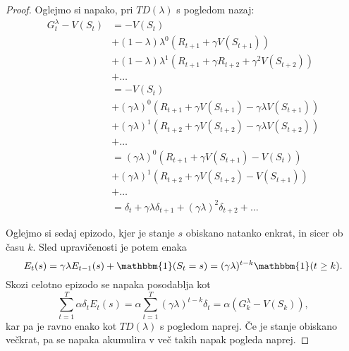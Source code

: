 \documentclass[12pt,a4paper]{amsart}
\theoremstyle{definition} %
\theoremstyle{plain} %
\begin{document}
\begin{proof} 
    Oglejmo si napako, pri $TD(\lambda)$ s pogledom nazaj:
    \begin{align*}
    G_t^\lambda - V(S_t) &= - V(S_t) \\
                         &+ (1 - \lambda) \lambda^0 (R_{t+1} + \gamma V(S_{t+1})) \\
                         &+ (1 - \lambda) \lambda^1 (R_{t+1} + \gamma R_{t+2} + 
                                \gamma^2 V(S_{t+2})) \\
                         &+ \dots \\
                         &= - V(S_t) \\
                         &+ (\gamma \lambda)^0 (R_{t+1} + \gamma V(S_{t+1}) - 
                                \gamma \lambda V(S_{t+1})) \\
                         &+ (\gamma \lambda)^1 (R_{t+2} + \gamma V(S_{t+2}) - 
                                \gamma \lambda V(S_{t+2})) \\
                         &+ \dots \\
                         &= (\gamma \lambda)^0 (R_{t+1} + \gamma V(S_{t+1}) - V(S_t)) \\
                         &+ (\gamma \lambda)^1 (R_{t+2} + \gamma V(S_{t+2}) - V(S_{t+1})) \\
                         &+ \dots \\
                         &= \delta_t + \gamma \lambda \delta_{t+1} + 
                                (\gamma \lambda)^2 \delta_{t+2} + \dots
    \end{align*}

    Oglejmo si sedaj epizodo, kjer je stanje $s$ obiskano natanko enkrat, in sicer ob času $k$. 
    Sled upravičenosti je potem enaka 
    $$
    E_t(s) = \gamma \lambda E_{t-1}(s) + \mathbbm{1}(S_t = s) = (\gamma \lambda)^{t-k} 
    \mathbbm{1}(t \geq k).
    $$
    Skozi celotno epizodo se napaka posodablja kot 
    $$
    \sum_{t=1}^T \alpha \delta_t E_t(s) = \alpha \sum_{t=1}^T (\gamma \lambda)^{t-k} \delta_t =
    \alpha (G_k^\lambda - V(S_k)),
    $$
    kar pa je ravno enako kot $TD(\lambda)$ s pogledom naprej. Če je stanje obiskano večkrat, pa
    se napaka akumulira v več takih napak pogleda naprej.
\end{proof}
\end{document}
